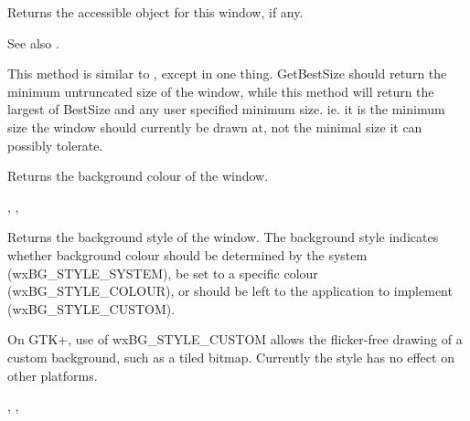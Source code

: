 \label{wxwindowgetaccessible}


Returns the accessible object for this window, if any.

See also .


\label{wxwindowgetadjustedbestsize}


This method is similar to , except
in one thing.  GetBestSize should return the minimum untruncated size of the
window, while this method will return the largest of BestSize and any user
specified minimum size.  ie. it is the minimum size the window should currently
be drawn at, not the minimal size it can possibly tolerate.


\label{wxwindowgetbackgroundcolour}


Returns the background colour of the window.


,\rtfsp
{},\rtfsp
{}

\label{wxwindowgetbackgroundstyle}


Returns the background style of the window. The background style indicates
whether background colour should be determined by the system (wxBG\_STYLE\_SYSTEM),
be set to a specific colour (wxBG\_STYLE\_COLOUR), or should be left to the
application to implement (wxBG\_STYLE\_CUSTOM).

On GTK+, use of wxBG\_STYLE\_CUSTOM allows the flicker-free drawing of a custom
background, such as a tiled bitmap. Currently the style has no effect on other platforms.


,\rtfsp
{},\rtfsp
{}

